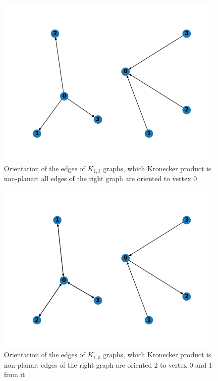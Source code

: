 \begin{figure}[h]

  \begin{center}  
  \includegraphics[scale = 0.3]{k13_3.png}
  \end{center}

  \caption{Orientation of the edges of $K_{1, 3}$ graphs, which Kronecker product is non-planar: all edges of the right graph are oriented to vertex $0$}

  \label{fig:k13_3}

\end{figure}

\begin{figure}[h]

  \begin{center}  
  \includegraphics[scale = 0.3]{k13_12.png}
  \end{center}

  \caption{Orientation of the edges of $K_{1, 3}$ graphs, which Kronecker product is non-planar: edges of the right graph are oriented 2 to vertex $0$ and 1 from it}

  \label{fig:k13_12}

\end{figure}

